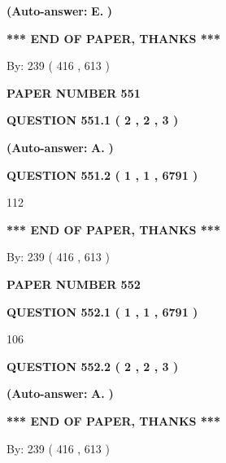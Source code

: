 \documentclass{ctexart}
\begin{document}
 
{\textbf{(Auto-answer:}}
{\textbf{\large{
E.}}}
{\textbf{)}}
 
 
   
   
   
   
\vspace{1.0in} 
{\textbf{\large{ *** END OF PAPER, THANKS *** }}} 
   
   
\hspace{1.0in} By: 
 239 ( 416 ,  613 )
   
   
   
   
\newpage 
\setcounter{page}{ 
   551001 } 
   
   
 {\textbf{ \Large{ PAPER NUMBER  551  }}}
   
   
   
   
  
  
{\textbf{\large{QUESTION
551.1 
 ( 2 , 2 , 3 )
}}}
 
 
{\textbf{(Auto-answer:}}
{\textbf{\large{
A.}}}
{\textbf{)}}
 
 
  
  
{\textbf{\large{QUESTION
551.2 
 ( 1 , 1 , 6791 )
}}}

112
   
   
   
   
\vspace{1.0in} 
{\textbf{\large{ *** END OF PAPER, THANKS *** }}} 
   
   
\hspace{1.0in} By: 
 239 ( 416 ,  613 )
   
   
   
   
\newpage 
\setcounter{page}{ 
   552001 } 
   
   
 {\textbf{ \Large{ PAPER NUMBER  552  }}}
   
   
   
   
  
  
{\textbf{\large{QUESTION
552.1 
 ( 1 , 1 , 6791 )
}}}

106
  
  
{\textbf{\large{QUESTION
552.2 
 ( 2 , 2 , 3 )
}}}
 
 
{\textbf{(Auto-answer:}}
{\textbf{\large{
A.}}}
{\textbf{)}}
 
 
   
   
   
   
\vspace{1.0in} 
{\textbf{\large{ *** END OF PAPER, THANKS *** }}} 
   
   
\hspace{1.0in} By: 
 239 ( 416 ,  613 )
   
   
   
\end{document}
